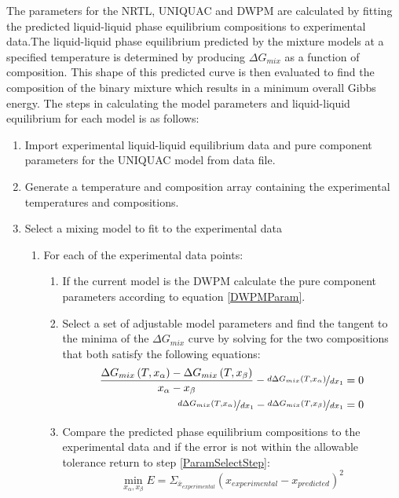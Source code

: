 				The parameters for the NRTL, UNIQUAC and DWPM are calculated by fitting the predicted liquid-liquid phase equilibrium compositions to experimental data.The liquid-liquid phase equilibrium predicted by the mixture models at a specified temperature is determined by producing $\Delta G_{mix}$ as a function of composition. This shape of this predicted curve is then evaluated to find the composition of the binary mixture which results in a minimum overall Gibbs energy. The steps in calculating the model parameters and liquid-liquid equilibrium for each model is as follows:
			\begin{enumerate}
				\item Import experimental liquid-liquid equilibrium data and pure component parameters for the UNIQUAC model from data file.
				\item Generate a temperature and composition array containing the experimental temperatures and compositions.
				\item Select a mixing model to fit to the experimental data \label{ModelSelectStep}
					\begin{enumerate}
						\item For each of the experimental data points:
							\begin{enumerate}
								\item If the current model is the DWPM calculate the pure component parameters according to equation \ref{DWPMParam}.
								\item Select a set of adjustable model parameters and find the tangent to the minima of the $\Delta G_{mix}$ curve by solving for the two compositions that both satisfy the following equations: \label{ParamSelectStep}
									\begin{eqnarray}
									 	\dfrac{\Delta G_{mix}\left(T, x_{\alpha}\right)- \Delta G_{mix}\left(T, x_{\beta }\right)}{x_{\alpha}-x_{\beta}} - \nicefrac{d \Delta G_{mix}\left(T, x_{\alpha}\right)}{dx_{1}} =0\\
									 	\label{GoalPhaseEq1}
									 	\nicefrac{d \Delta G_{mix}\left(T, x_{\alpha}\right)}{dx_{1}} - \nicefrac{d \Delta G_{mix}\left(T, x_{\beta}\right)}{dx_{1}} =0
									 	\label{GoalPhaseEq2}
									\end{eqnarray}
								\item Compare the predicted phase equilibrium compositions to the experimental data and if the error is not within the allowable tolerance return to step \ref{ParamSelectStep}:
								\begin{equation}
									\min_{x_{\alpha}, x_{\beta}} E = \Sigma_{\overline{x}_{experimental}}\left(x_{experimental}-x_{predicted}\right)^2 \label{GoalParams}
								\end{equation}
								

\end{enumerate}
\end{enumerate}
\end{enumerate}
